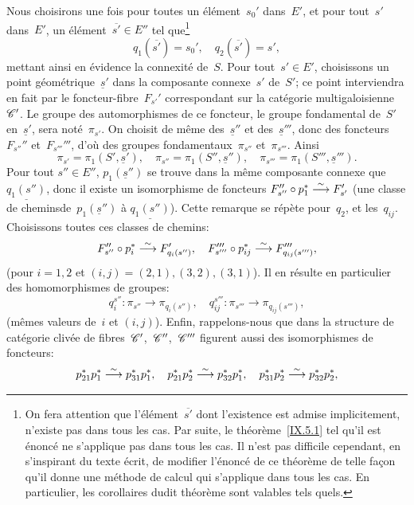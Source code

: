 Nous choisirons une fois pour toutes un \'el\'ement~$s_0'$
dans~$E'$, et pour tout~$s'$ dans~$E'$, un
\'el\'ement~$\overline{s'}\in E''$ tel que\footnote{On fera
attention que l'\'el\'ement~$\overline{s'}$ dont l'existence est
admise implicitement, n'existe pas dans tous les cas. Par suite, le
th\'eor\`eme~\ref{IX.5.1} tel qu'il est \'enonc\'e ne
s'applique pas dans tous les cas. Il n'est pas difficile cependant,
en s'inspirant du texte \'ecrit, de modifier l'\'enonc\'e de ce
th\'eor\`eme de telle fa\c con qu'il donne une m\'ethode de
calcul qui s'applique dans tous les cas. En particulier, les
corollaires dudit th\'eor\`eme sont valables tels quels.}
$$
q_1(\overline{s'})=s_0', \quad q_2(\overline{s'})=s',
$$
mettant ainsi en \'evidence la connexit\'e de~$S$. Pour
tout~$s'\in E'$, choisissons un point
g\'eom\'etrique~$\underline{s}'$ dans la composante connexe~$s'$
de~$S'$; ce point interviendra en fait par le foncteur-fibre~$F_{s'}'$
correspondant sur la cat\'egorie multigaloisienne~$\cal{C}'$. Le
groupe des automorphismes de ce foncteur, \ie le groupe fondamental
de~$S'$ en~$\underline{s}'$, sera not\'e~$\pi_{s'}$. On choisit de
m\^eme des~$\underline{s}''$ et des~$\underline{s}'''$, donc des
foncteurs~$F_{s''}''$ et~$F_{s'''}'''$, d'o\`u des groupes
fondamentaux~$\pi_{s''}$ et~$\pi_{s'''}$. Ainsi
$$
\pi_{s'}=\pi_1(S',\underline{s}'), \quad
\pi_{s''}=\pi_1(S'',\underline{s}''), \quad
\pi_{s'''}=\pi_1(S''',\underline{s}''').
$$
Pour tout $s''\in E''$, $p_1(\underline{s}'')$ se trouve dans la
m\^eme composante connexe que $\underline{q_1(s'')}$, donc il existe
un isomorphisme de foncteurs
$F''_{s''}\circ p_1^*\overset{\sim}{\longrightarrow} F'_{s'}$
(\ie une \og classe de chemins\fg de~$p_1(\underline{s}'')$ \`a
$\underline{q_1(s'')}$). Cette remarque se r\'ep\`ete pour~$q_2$,
et les~$q_{ij}$. Choisissons toutes ces classes de chemins:
$$
F''_{s''}\circ p_i^*\overset{\sim}{\longrightarrow} F'_{q_i(s'')},\quad F_{s'''}'''\circ
p_{ij}^*\overset{\sim}{\longrightarrow} F'''_{q_{ij}(s''')},
$$
(pour
$i=1,2$ et $(i,j)=(2,1),(3,2),(3,1)$). Il en r\'esulte en
particulier des homomorphismes de groupes:
\begin{equation*}
\label{eq:IX.5.2}
\tag{2} {q_i^{s''}\colon \pi_{s''}\to\pi_{q_i(s'')},\quad
q_{ij}^{s'''}\colon \pi_{s'''}\to\pi_{q_{ij}(s''')},}
\end{equation*}
(m\^emes valeurs de~$i$ et $(i,j)$). Enfin, rappelons-nous que dans
la structure de cat\'egorie cliv\'ee de
fibres~$\cal{C}'$,~$\cal{C''}$,~$\cal{C'''}$ figurent aussi des
isomorphismes de foncteurs:
$$
p_{21}^*p_1^*\overset{\sim}{\longrightarrow} p_{31}^*p_1^*,\quad p_{21}^*p_2^*\overset{\sim}{\longrightarrow}
p_{32}^*p_1^*,\quad p_{31}^*p_2^*\overset{\sim}{\longrightarrow} p_{32}^*p_2^*,
$$
